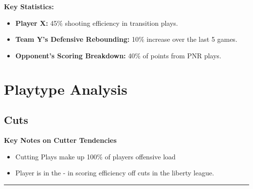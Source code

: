 \documentclass[a4paper,12pt]{article}
\begin{document}
\textbf{Key Statistics:}
\begin{itemize}
    \item \textbf{Player X:} 45\% shooting efficiency in transition plays.
    \item \textbf{Team Y's Defensive Rebounding:} 10\% increase over the last 5 games.
    \item \textbf{Opponent's Scoring Breakdown:} 40\% of points from PNR plays.
\end{itemize}

\newpage
\section{Playtype Analysis}

\subsection{Cuts}
\vspace{0.25em} %
\textbf{Key Notes on Cutter Tendencies}
\vspace{0.5em} %

\begin{itemize}
    \item Cutting Plays make up 100\% of players offensive load
    \vspace{0.3em} %
    \item Player is in the - in scoring efficiency off cuts in the liberty league.
\end{itemize}

\vspace{1em} %
\hrule height 1pt width 1\textwidth %
\vspace{0em} %
\end{document}
